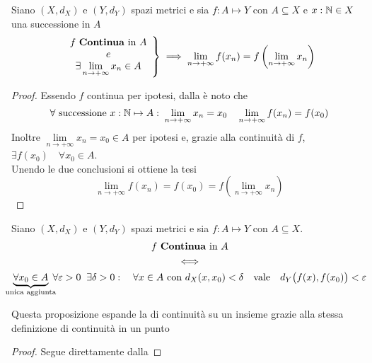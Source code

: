 \begin{corollary}
	Siano $(X,d_X)$ e $(Y,d_Y)$ spazi metrici e sia $f: A \mapsto Y$ con $A \subseteq X$ e $x: \mathbb{N} \in X$ una successione in $A$
	\begin{equation*}
		\left.
		\begin{array}{c}
			f \text{ \textbf{Continua} in } A\\
			e\\
			\exists \lim\limits_{n \to +\infty} x_n \in A
		\end{array}
		\right\} \implies
		\lim\limits_{n \to +\infty} f(x_n) = f\left( \lim\limits_{n \to +\infty} x_n \right)
	\end{equation*}
	\begin{proof}
		Essendo $f$ continua per ipotesi, dalla  è noto che
		$$\forall \text{ successione } x:\mathbb{N} \mapsto A:\; \lim\limits_{n \to +\infty} x_n = x_0 \quad \lim\limits_{n \to +\infty} f(x_n) = f(x_0)$$
		Inoltre $\lim\limits_{n \to +\infty} x_n = x_0 \in A$ per ipotesi e, grazie alla continuità di $f$, $\exists f(x_0) \quad \forall x_0 \in A$.\\
		Unendo le due conclusioni si ottiene la tesi
		$$\lim\limits_{n \to +\infty} f(x_n) = f(x_0) = f\left( \lim\limits_{n \to +\infty} x_n \right)$$
	\end{proof}
\end{corollary}

\begin{proposition}
	\label{prop:funz_cont_per_succ_in_ins}
	Siano $(X,d_X)$ e $(Y,d_Y)$ spazi metrici e sia $f: A \mapsto Y$ con $A \subseteq X$.
	\begin{equation}
		\begin{gathered}
			f \text{ \textbf{Continua} in } A\\
			\iff\\
			\underbrace{\forall x_0 \in A}_{\mathclap{\text{unica aggiunta}}} \; \forall \varepsilon > 0\;\;\exists \delta > 0:\quad \forall x \in A \text{ con } d_X(x,x_0)<\delta \quad \text{vale} \quad d_Y \bigl(f(x),f(x_0)\bigr) < \varepsilon
		\end{gathered}
	\end{equation}
	\begin{note}
		Questa proposizione espande la  di continuità su un insieme grazie alla stessa definizione di continuità in un punto
	\end{note}
	\begin{proof}
		Segue direttamente dalla 
	\end{proof}
\end{proposition}

